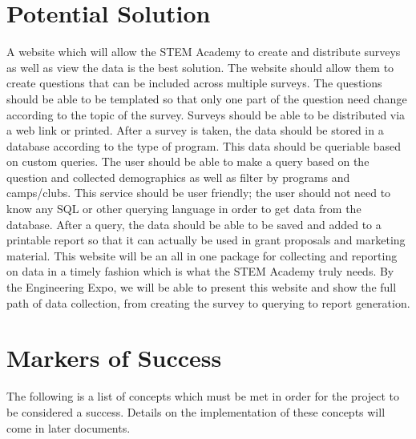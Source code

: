 \documentclass[draftclsnofoot,onecolumn,notitlepage]{article}
\begin{document}
\section{Potential Solution}
A website which will allow the STEM Academy to create and distribute surveys as well as view the data is the best solution. The website should allow them to create questions that can be included across multiple surveys. The questions should be able to be templated so that only one part of the question need change according to the topic of the survey. Surveys should be able to be distributed via a web link or printed. After a survey is taken, the data should be stored in a database according to the type of program. This data should be queriable based on custom queries. The user should be able to make a query based on the question and collected demographics as well as filter by programs and camps/clubs. This service should be user friendly; the user should not need to know any SQL or other querying language in order to get data from the database. After a query, the data should be able to be saved and added to a printable report so that it can actually be used in grant proposals and marketing material. This website will be an all in one package for collecting and reporting on data in a timely fashion which is what the STEM Academy truly needs. By the Engineering Expo, we will be able to present this website and show the full path of data collection, from creating the survey to querying to report generation.
\section{Markers of Success}
The following is a list of concepts which must be met in order for the project to be considered a success. Details on the implementation of these concepts will come in later documents. 
\end{document}
